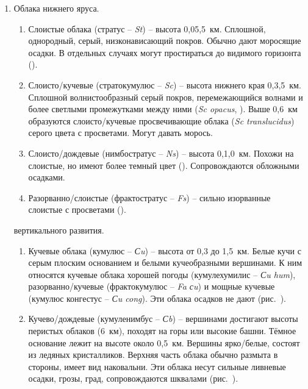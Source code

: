 \begin{enumerate}[label=\Roman*.]

\item Облака нижнего яруса.
  \begin{enumerate}[label=\arabic*)]
  \item Слоистые облака (стратус \--- \textit{St}) \--- высота
    0,05,5~км. Сплошной, однородный, серый, низконависающий
    покров. Обычно дают моросящие осадки. В отдельных случаях могут
    простираться до видимого горизонта ().
  \item Слоисто\-/кучевые (стратокумулюс \--- \textit{Sc}) \--- высота
    нижнего края 0,3,5~км. Сплошной волнистообразный серый
    покров, перемежающийся волнами и более светлыми промежутками между
    ними (\textit{Sc opacus}, ). Выше
    0,6~км образуются слоисто\-/кучевые просвечивающие облака
    (\textit{Sc translucidus}) серого цвета с просветами. Могут давать
    морось.
  \item Слоисто\-/дождевые (нимбостратус \--- \textit{Ns}) \--- высота
    0,1,0~км. Похожи на слоистые, но имеют более темный
    цвет (). Сопровождаются обложными осадками.
  \item Разорванно\-/слоистые (фрактостратус \--- \textit{Fs}) \---
    сильно изорванные слоистые с просветами ().
  \end{enumerate}

 вертикального развития.
  \begin{enumerate}[label=\arabic*)]
  \item Кучевые облака (кумулюс \--- \textit{Сu}) \--- высота от 0,3
    до 1,5~км. Белые кучи с серым плоским основанием и белыми
    кучеобразными вершинами. К ним относятся кучевые облака хорошей
    погоды (кумулехумилис \--- \textit{Сu hum}), разорванно\-/кучевые
    (фрактокумулюс \--- \textit{Fa сu}) и мощные кучевые (кумулюс
    конгестус \--- \textit{Сu cong}). Эти облака осадков не дают
    (рис.~).
  \item Кучево\-/дождевые (кумуленимбус \--- \textit{Сb}) \---
    вершинами достигают высоты перистых облаков (6~км),
    походят на горы или высокие башни. Тёмное основание лежит на
    высоте около 0,5~км. Вершины ярко\-/белые, состоят из ледяных
    кристалликов. Верхняя часть облака обычно размыта в стороны, имеет
    вид наковальни. Эти облака несут сильные ливневые осадки, грозы,
    град, сопровождаются шквалами (рис.~).
  \end{enumerate}


\end{enumerate}
